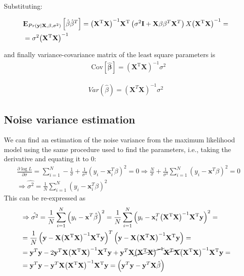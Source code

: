 \documentclass[12pt, letterpaper]{article}
\theoremstyle{definition}
\newcommand{\E}{{\rm I\kern-.3em E}}
\newcommand{\Cov}{\mathrm{Cov}}
\newcommand{\X}{\mathrm{\mathbf{X}}}
\newcommand{\y}{\mathbf{y}}
\newcommand{\x}{\mathbf{x}}
\newcommand{\inv}{\mathrm{\left( \X^T\X\right)^{-1}}}
\newcommand{\HM}{\mathrm{\inv\X^T}}
\newcommand{\hb}{\mathrm{\hat{\mathbf{\beta}}}}
\begin{document}
Substituting:

\begin{equation}
\begin{aligned}
&\E_{Pr(\y|\X,\beta, \sigma^2)}\left[ \hb\hb^T\right] = \HM \left(\sigma^2 \mathbf{I} +\X\beta \beta^T\X^T\right)X \inv   = \\
 &=\sigma^2 \inv 
\end{aligned}
\end{equation}

and finally variance-covariance matrix of the least square parameters is 
\begin{equation}
\begin{aligned}
&\Cov\left[ \hb\right]=  \inv  \sigma^2
\end{aligned}
\end{equation}
 
\begin{align}
Var(\hat{\beta}) = (\X^T\X)^{-1} \sigma^2
\end{align}

\subsection{Noise variance estimation}
We can find an estimation of the noise variance from the maximum likelihood model using the same procedure used to find the parameters, i.e., taking the derivative and equating it to $0$:
\begin{equation}
\begin{aligned}
\label{varErr}
&\frac{\partial \log L}{\partial \sigma} = \sum_{i=1}^N-\frac{1}{\sigma} +\frac{1}{\sigma^3} \left(y_i - \x_i^T\beta\right)^2 = 0 \Rightarrow \frac{N}{\sigma} +\frac{1}{\sigma^3}  \sum_{i=1}^N\left(y_i - \x^T\beta\right)^2 = 0\\
&\Rightarrow \hat{\sigma^2} = \frac{1}{N}\sum_{i=1}^N\left(y_i - \x_i^T\beta\right)^2 
\end{aligned}
\end{equation}
This can be re-expressed as
\begin{equation}
\begin{aligned}
&\Rightarrow \hat{\sigma^2} = \frac{1}{N}\sum_{i=1}^N\left(y_i - \x^T\hb\right)^2  = \frac{1}{N}\sum_{i=1}^N\left(y_i - \x_i^T\HM\y\right)^2 = \\
&= \frac{1}{N}\left(\y - \X\HM\y\right)^T\left(\y - \X\HM\y\right) = \\
&=\y^T\y  - 2 \y^T  \X\HM\y + \y^T \X \cancel{\inv} \cancel{\X^T \X}\HM\y = \\
&=\y^T\y  - \y^T  \X\HM\y  = \left(\y^T\y - \y^T\X\hb \right)
\end{aligned}
\end{equation}
\end{document}
